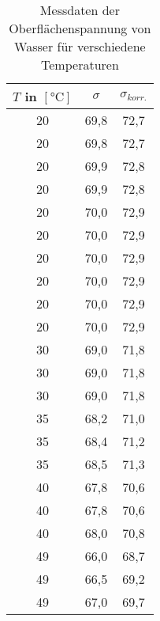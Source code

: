 \begin{table}[h!]
	\renewcommand*{\arraystretch}{1.2}
	\centering
	\caption{Messdaten der Oberflächenspannung von Wasser für verschiedene Temperaturen}
	\begin{tabular}{c|c|c}
		\hline
		$T$ in $\left[\si{\celsius}\right]$ & $\sigma$& $\sigma_{korr.}$ \\
		\hline
		20    & 69,8  & 72,7 \\
		20    & 69,8  & 72,7 \\
		20    & 69,9  & 72,8 \\
		20    & 69,9  & 72,8 \\
		20    & 70,0    & 72,9 \\
		20    & 70,0    & 72,9 \\
		20    & 70,0    & 72,9 \\
		20    & 70,0    & 72,9 \\
		20    & 70,0    & 72,9 \\
		20    & 70,0    & 72,9 \\
		30    & 69,0    & 71,8 \\
		30    & 69,0    & 71,8 \\
		30    & 69,0    & 71,8 \\
		35    & 68,2  & 71,0 \\
		35    & 68,4  & 71,2 \\
		35    & 68,5  & 71,3 \\
		40    & 67,8  & 70,6 \\
		40    & 67,8  & 70,6 \\
		40    & 68,0    & 70,8 \\
		49    & 66,0    & 68,7 \\
		49    & 66,5  & 69,2 \\
		49    & 67,0    & 69,7 \\
		\hline
	   \end{tabular}%
	\label{tab:temperatur_daten}%
\end{table}%
\FloatBarrier

